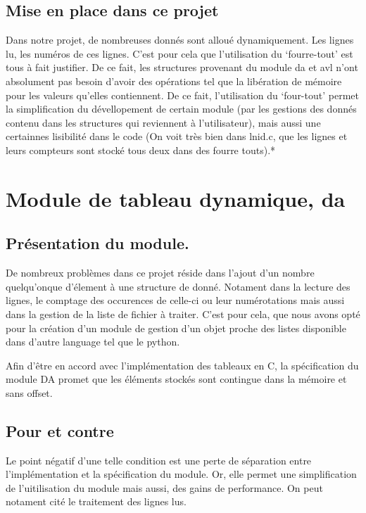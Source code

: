 \documentclass[12pt]{article}
\begin{document}
    \subsection{Mise en place dans ce projet}

    Dans notre projet, de nombreuses donnés sont alloué dynamiquement. Les 
    lignes lu, les numéros de ces lignes. C'est pour cela que l'utilisation du 
    `fourre-tout' est tous à fait justifier. De ce fait, les structures 
    provenant du module da et avl n'ont absolument pas besoin d'avoir des
    opérations tel que la libération de mémoire pour les valeurs qu'elles 
    contiennent. De ce fait, l'utilisation du `four-tout' permet la 
    simplification du dévellopement de certain module (par les gestions des 
    donnés contenu dans les structures qui reviennent à l'utilisateur), mais 
    aussi une certainnes lisibilité dans le code (On voit très bien dans lnid.c,
    que les lignes et leurs compteurs sont stocké tous deux dans des fourre 
    touts).*

    \newpage

    \section{Module de tableau dynamique, da}

    \subsection{Présentation du module.}

    De nombreux problèmes dans ce projet réside dans l'ajout d'un nombre 
    quelqu'onque d'élement à une structure de donné. Notament dans la 
    lecture des lignes, le comptage des occurences de celle-ci ou leur 
    numérotations mais aussi dans la gestion de la liste de fichier à 
    traiter. C'est pour cela, que nous avons opté pour la création d'un 
    module de gestion d'un objet proche des listes disponible dans d'autre 
    language tel que le python. 

    Afin d'être en accord avec l'implémentation des tableaux en C, la 
    spécification du module DA promet que les éléments stockés sont 
    contingue dans la mémoire et sans offset.
    
    \subsection{Pour et contre}

    Le point négatif d'une telle condition est une perte de séparation 
    entre l'implémentation et la spécification du module. Or, elle permet 
    une simplification de l'uitilisation du module mais aussi, des gains de 
    performance. On peut notament cité le traitement des lignes lus. 
\end{document}
